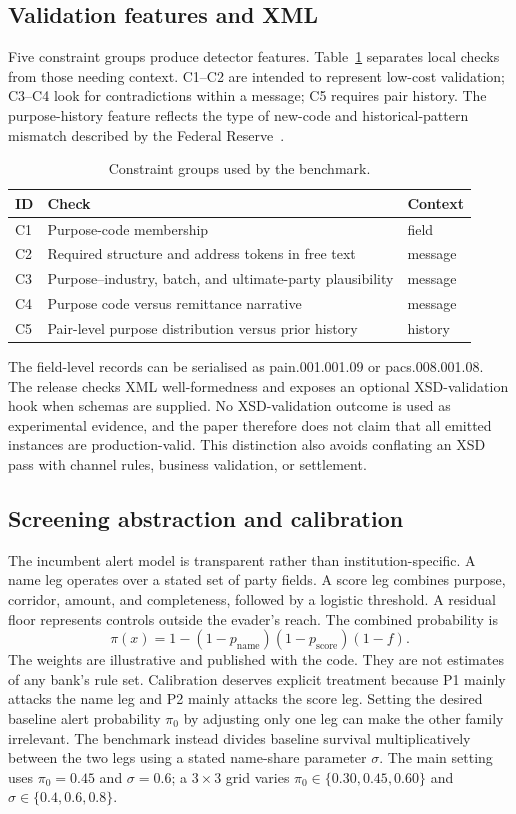 \documentclass[conference]{IEEEtran}
\begin{document}
\subsection{Validation features and XML}
Five constraint groups produce detector features. Table~\ref{tab:constraints}
separates local checks from those needing context. C1--C2 are intended to
represent low-cost validation; C3--C4 look for contradictions within a
message; C5 requires pair history. The purpose-history feature reflects the
type of new-code and historical-pattern mismatch described by the Federal
Reserve~\cite{frb2026}.
\begin{table}[!t]
\caption{Constraint groups used by the benchmark.}
\label{tab:constraints}
\centering
\scriptsize
\begin{tabularx}{\columnwidth}{@{}lXl@{}}
\toprule
ID & Check & Context \\
\midrule
C1 & Purpose-code membership & field \\
C2 & Required structure and address tokens in free text & message \\
C3 & Purpose--industry, batch, and ultimate-party plausibility & message \\
C4 & Purpose code versus remittance narrative & message \\
C5 & Pair-level purpose distribution versus prior history & history \\
\bottomrule
\end{tabularx}
\end{table}
The field-level records can be serialised as pain.001.001.09 or
pacs.008.001.08. The release checks XML well-formedness and exposes an optional
XSD-validation hook when schemas are supplied. No XSD-validation outcome is
used as experimental evidence, and the paper therefore does not claim that all
emitted instances are production-valid. This distinction also avoids
conflating an XSD pass with channel rules, business validation, or settlement.
\subsection{Screening abstraction and calibration}
The incumbent alert model is transparent rather than institution-specific. A
name leg operates over a stated set of party fields. A score leg combines
purpose, corridor, amount, and completeness, followed by a logistic threshold.
A residual floor represents controls outside the evader's reach. The combined
probability is
\begin{equation}
 \pi(x)=1-(1-p_{\mathrm{name}})(1-p_{\mathrm{score}})(1-f).
 \label{eq:screening}
\end{equation}
The weights are illustrative and published with the code. They are not
estimates of any bank's rule set.
Calibration deserves explicit treatment because P1 mainly attacks the name
leg and P2 mainly attacks the score leg. Setting the desired baseline alert
probability $\pi_0$ by adjusting only one leg can make the other family
irrelevant. The benchmark instead divides baseline survival multiplicatively
between the two legs using a stated name-share parameter $\sigma$. The main
setting uses $\pi_0=0.45$ and $\sigma=0.6$; a $3\times3$ grid varies
$\pi_0\in\{0.30,0.45,0.60\}$ and $\sigma\in\{0.4,0.6,0.8\}$.
\end{document}
